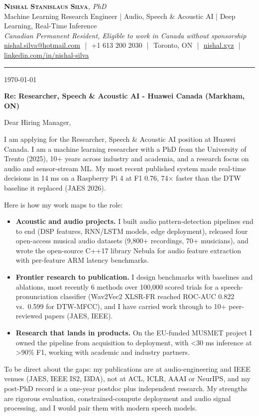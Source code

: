 \documentclass[11pt]{article}
\makeatletter
\newcommand{\clName}{Nishal Stanislaus Silva}
\newcommand{\clEmail}{nishal.silva@hotmail.com}
\newcommand{\clPhone}{+1 613 200 2030}
\newcommand{\clCity}{Toronto, ON}
\newcommand{\clSite}{https://nishal.xyz}
\newcommand{\clLinkedIn}{https://www.linkedin.com/in/nishal-silva}
\newcommand{\clStatus}{Canadian Permanent Resident, Eligible to work in Canada without sponsorship}
\newcommand{\clTagline}{Machine Learning Research Engineer | Audio, Speech \& Acoustic AI | Deep Learning, Real-Time Inference}
\newcommand{\clRole}{Researcher, Speech \& Acoustic AI}
\newcommand{\clCompany}{Huawei Canada}
\newcommand{\clAddressee}{Dear Hiring Manager,}
\makeatother
\begin{document}
\pagestyle{empty}

\begin{center}
    {\LARGE \scshape \textbf{\clName}}{\large \textit{, PhD}}
    \\[1pt]
    {\small \clTagline}
    \\[1pt]
    {\footnotesize\textit{\clStatus}}
    \\[1pt]
    {\small
    \href{mailto:\clEmail}{\clEmail}
    \,\,|\,\, \clPhone
    \,\,|\,\, \clCity
    \,\,|\,\, \href{\clSite}{nishal.xyz}
    \,\,|\,\, \href{\clLinkedIn}{linkedin.com/in/nishal-silva}}
\end{center}

\rule{\linewidth}{0.4pt}\vspace{0.6em}

\today

\textbf{Re: \clRole{} - \clCompany{} (Markham, ON)}

\clAddressee

I am applying for the \clRole{} position at \clCompany{}. I am a machine learning researcher with a PhD from the University of Trento (2025), 10+ years across industry and academia, and a research focus on audio and sensor-stream ML. My most recent published system made real-time decisions in 14 ms on a Raspberry Pi 4 at F1 0.76, 74$\times$ faster than the DTW baseline it replaced (JAES 2026).

Here is how my work maps to the role:
\begin{itemize}[leftmargin=1.4em, itemsep=0.1em, topsep=0.2em]
    \item \textbf{Acoustic and audio projects.} I built audio pattern-detection pipelines end to end (DSP features, RNN/LSTM models, edge deployment), released four open-access musical audio datasets (9,800+ recordings, 70+ musicians), and wrote the open-source C++17 library Nebula for audio feature extraction with per-feature ARM latency benchmarks.
    \item \textbf{Frontier research to publication.} I design benchmarks with baselines and ablations, most recently 6 methods over 100,000 scored trials for a speech-pronunciation classifier (Wav2Vec2 XLSR-FR reached ROC-AUC 0.822 vs.\ 0.599 for DTW-MFCC), and I have carried work through to 10+ peer-reviewed papers (JAES, IEEE).
    \item \textbf{Research that lands in products.} On the EU-funded MUSMET project I owned the pipeline from acquisition to deployment, with <30 ms inference at >90\% F1, working with academic and industry partners.
\end{itemize}
To be direct about the gaps: my publications are at audio-engineering and IEEE venues (JAES, IEEE IS2, I3DA), not at ACL, ICLR, AAAI or NeurIPS, and my post-PhD record is a one-year postdoc plus independent research. My strengths are rigorous evaluation, constrained-compute deployment and audio signal processing, and I would pair them with modern speech models.
\end{document}
